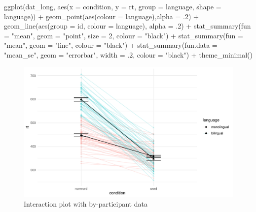 \documentclass[
  english,
  doc,floatsintext]{apa6}
\newenvironment{Shaded}{\begin{snugshade}}{\end{snugshade}}
\newcommand{\AttributeTok}[1]{\textcolor[rgb]{0.77,0.63,0.00}{#1}}
\newcommand{\DecValTok}[1]{\textcolor[rgb]{0.00,0.00,0.81}{#1}}
\newcommand{\FunctionTok}[1]{\textcolor[rgb]{0.00,0.00,0.00}{#1}}
\newcommand{\NormalTok}[1]{#1}
\newcommand{\SpecialCharTok}[1]{\textcolor[rgb]{0.00,0.00,0.00}{#1}}
\newcommand{\StringTok}[1]{\textcolor[rgb]{0.31,0.60,0.02}{#1}}
\begin{document}
\begin{Shaded}
\begin{Highlighting}[]
\FunctionTok{ggplot}\NormalTok{(dat\_long, }\FunctionTok{aes}\NormalTok{(}\AttributeTok{x =}\NormalTok{ condition, }\AttributeTok{y =}\NormalTok{ rt, }
                     \AttributeTok{group =}\NormalTok{ language, }\AttributeTok{shape =}\NormalTok{ language)) }\SpecialCharTok{+}
  \FunctionTok{geom\_point}\NormalTok{(}\FunctionTok{aes}\NormalTok{(}\AttributeTok{colour =}\NormalTok{ language),}\AttributeTok{alpha =}\NormalTok{ .}\DecValTok{2}\NormalTok{) }\SpecialCharTok{+}
  \FunctionTok{geom\_line}\NormalTok{(}\FunctionTok{aes}\NormalTok{(}\AttributeTok{group =}\NormalTok{ id, }\AttributeTok{colour =}\NormalTok{ language), }\AttributeTok{alpha =}\NormalTok{ .}\DecValTok{2}\NormalTok{) }\SpecialCharTok{+}
   \FunctionTok{stat\_summary}\NormalTok{(}\AttributeTok{fun =} \StringTok{"mean"}\NormalTok{, }\AttributeTok{geom =} \StringTok{"point"}\NormalTok{, }\AttributeTok{size =} \DecValTok{2}\NormalTok{, }\AttributeTok{colour =} \StringTok{"black"}\NormalTok{) }\SpecialCharTok{+}
  \FunctionTok{stat\_summary}\NormalTok{(}\AttributeTok{fun =} \StringTok{"mean"}\NormalTok{, }\AttributeTok{geom =} \StringTok{"line"}\NormalTok{, }\AttributeTok{colour =} \StringTok{"black"}\NormalTok{) }\SpecialCharTok{+}
  \FunctionTok{stat\_summary}\NormalTok{(}\AttributeTok{fun.data =} \StringTok{"mean\_se"}\NormalTok{, }\AttributeTok{geom =} \StringTok{"errorbar"}\NormalTok{, }
               \AttributeTok{width =}\NormalTok{ .}\DecValTok{2}\NormalTok{, }\AttributeTok{colour =} \StringTok{"black"}\NormalTok{) }\SpecialCharTok{+}
  \FunctionTok{theme\_minimal}\NormalTok{()}
\end{Highlighting}
\end{Shaded}

\begin{figure}

{\centering \includegraphics[width=1\linewidth]{images/ixn-by-subj-1} 

}

\caption{Interaction plot with by-participant data}\label{fig:ixn-by-subj}
\end{figure}
\end{document}
